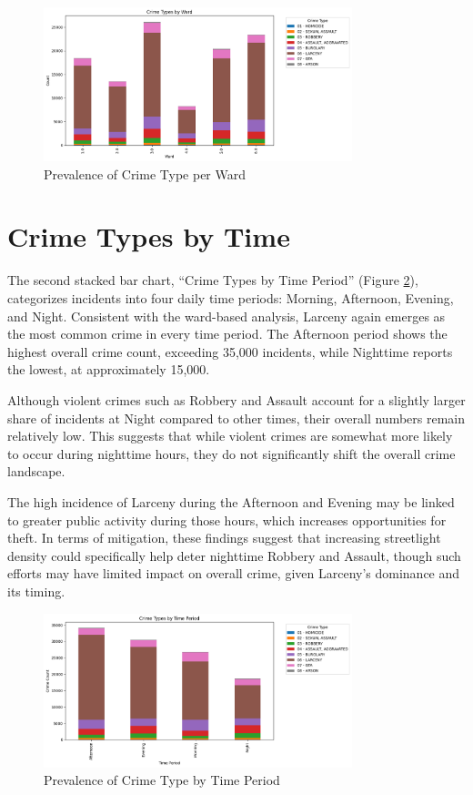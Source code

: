 \documentclass{report}
\begin{document}
\begin{figure}[htbp]
  \centering
  \includegraphics[width=0.8\textwidth]{crime-types-by-ward.png}
  \caption{Prevalence of Crime Type per Ward}
  \label{fig:crime-type-by-ward}
\end{figure}

\newpage
\section{Crime Types by Time}
\par The second stacked bar chart, “Crime Types by Time Period” (Figure \ref{fig:crime-type-by-time}), categorizes incidents into four daily time periods: Morning, Afternoon, Evening, and Night. Consistent with the ward-based analysis, Larceny again emerges as the most common crime in every time period. The Afternoon period shows the highest overall crime count, exceeding 35,000 incidents, while Nighttime reports the lowest, at approximately 15,000.

Although violent crimes such as Robbery and Assault account for a slightly larger share of incidents at Night compared to other times, their overall numbers remain relatively low. This suggests that while violent crimes are somewhat more likely to occur during nighttime hours, they do not significantly shift the overall crime landscape.

The high incidence of Larceny during the Afternoon and Evening may be linked to greater public activity during those hours, which increases opportunities for theft. In terms of mitigation, these findings suggest that increasing streetlight density could specifically help deter nighttime Robbery and Assault, though such efforts may have limited impact on overall crime, given Larceny's dominance and its timing.

\begin{figure}[htbp]
  \centering
  \includegraphics[width=0.8\textwidth]{crime-types-by-time.png}
  \caption{Prevalence of Crime Type by Time Period}
  \label{fig:crime-type-by-time}
\end{figure}
\end{document}
